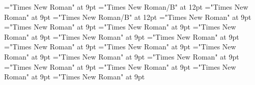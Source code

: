 \documentclass[gps1,twoside]{article}
\begin{document}
\font\configtargetconfigtargetconfigtargetslexsensereferencelexsensereferencessensesensessensesensessubentrysubentriesentrybefore="Times New Roman" at 9pt
\font\spanbzhheadwordconfigtargetconfigtargetslexsensereferencelexsensereferencessensesensessensesensessubentrysubentriesentry="Times New Roman/B" at 12pt
\font\headwordconfigtargetconfigtargetslexsensereferencelexsensereferencessensesensessensesensessubentrysubentriesentrybefore="Times New Roman" at 9pt
\font\spanheadwordconfigtargetconfigtargetslexsensereferencelexsensereferencessensesensessensesensessubentrysubentriesentry="Times New Roman/B" at 12pt
\font\variantformentrybackrefvariantformentrybackrefvariantformentrybackrefssensesensessensesensessubentrysubentriesentrybefore="Times New Roman" at 9pt
\font\variantformentrybackrefssensesensessensesensessubentrysubentriesentrybefore="Times New Roman" at 9pt
\font\variantformentrybackrefssensesensessensesensessubentrysubentriesentryafter="Times New Roman" at 9pt
\font\variantentrytypevariantentrytypevariantentrytypesvariantformentrybackrefvariantformentrybackrefssensesensessensesensessubentrysubentriesentrybefore="Times New Roman" at 9pt
\font\variantentrytypesvariantformentrybackrefvariantformentrybackrefssensesensessensesensessubentrysubentriesentryafter="Times New Roman" at 9pt
\font\reverseabbrvariantentrytypevariantentrytypesvariantformentrybackrefvariantformentrybackrefssensesensessensesensessubentrysubentriesentrybefore="Times New Roman" at 9pt
\font\spanreverseabbrvariantentrytypevariantentrytypesvariantformentrybackrefvariantformentrybackrefssensesensessensesensessubentrysubentriesentrylastchildafter="Times New Roman" at 9pt
\font\headwordvariantformentrybackrefvariantformentrybackrefssensesensessensesensessubentrysubentriesentrybefore="Times New Roman" at 9pt
\font\owningentrysummarydefinitionvariantformentrybackrefvariantformentrybackrefssensesensessensesensessubentrysubentriesentrybefore="Times New Roman" at 9pt
\font\spanowningentrysummarydefinitionvariantformentrybackrefvariantformentrybackrefssensesensessensesensessubentrysubentriesentrylastchildafter="Times New Roman" at 9pt
\font\scientificnamesensesensessensesensessubentrysubentriesentryafter="Times New Roman" at 9pt
\font\semanticdomainsemanticdomainsemanticdomainssensesensessensesensessubentrysubentriesentrybefore="Times New Roman" at 9pt
\font\semanticdomainssensesensessensesensessubentrysubentriesentrybefore="Times New Roman" at 9pt
\font\semanticdomainssensesensessensesensessubentrysubentriesentryafter="Times New Roman" at 9pt
\font\abbreviationsemanticdomainsemanticdomainssensesensessensesensessubentrysubentriesentrybefore="Times New Roman" at 9pt
\end{document}
